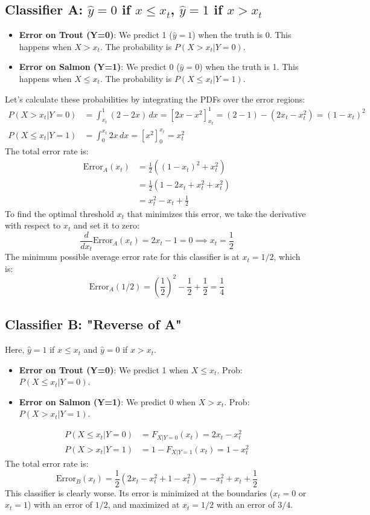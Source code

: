 \documentclass[11pt,a4paper]{article}
\begin{document}
\subsection{Classifier A: $\hat{y}=0$ if $x \le x_t$, $\hat{y}=1$ if $x > x_t$}
\begin{itemize}
    \item \textbf{Error on Trout (Y=0)}: We predict 1 ($\hat{y}=1$) when the truth is 0. This happens when $X > x_t$. The probability is $P(X > x_t | Y=0)$.
    \item \textbf{Error on Salmon (Y=1)}: We predict 0 ($\hat{y}=0$) when the truth is 1. This happens when $X \le x_t$. The probability is $P(X \le x_t | Y=1)$.
\end{itemize}
Let's calculate these probabilities by integrating the PDFs over the error regions:
\begin{align*}
    P(X > x_t | Y=0) &= \int_{x_t}^1 (2-2x) \,dx = [2x-x^2]_{x_t}^1 = (2-1) - (2x_t - x_t^2) = (1-x_t)^2 \\
    P(X \le x_t | Y=1) &= \int_0^{x_t} 2x \,dx = [x^2]_0^{x_t} = x_t^2
\end{align*}
The total error rate is:
\begin{align*}
    \text{Error}_A(x_t) &= \frac{1}{2} \left( (1-x_t)^2 + x_t^2 \right) \\
    &= \frac{1}{2} (1 - 2x_t + x_t^2 + x_t^2) \\
    &= x_t^2 - x_t + \frac{1}{2}
\end{align*}
To find the optimal threshold $x_t$ that minimizes this error, we take the derivative with respect to $x_t$ and set it to zero:
\[ \frac{d}{dx_t} \text{Error}_A(x_t) = 2x_t - 1 = 0 \implies x_t = \frac{1}{2} \]
The minimum possible average error rate for this classifier is at $x_t=1/2$, which is:
\[ \text{Error}_A(1/2) = \left(\frac{1}{2}\right)^2 - \frac{1}{2} + \frac{1}{2} = \frac{1}{4} \]

\subsection{Classifier B: "Reverse of A"}
Here, $\hat{y}=1$ if $x \le x_t$ and $\hat{y}=0$ if $x > x_t$.
\begin{itemize}
    \item \textbf{Error on Trout (Y=0)}: We predict 1 when $X \le x_t$. Prob: $P(X \le x_t | Y=0)$.
    \item \textbf{Error on Salmon (Y=1)}: We predict 0 when $X > x_t$. Prob: $P(X > x_t | Y=1)$.
\end{itemize}
\begin{align*}
    P(X \le x_t | Y=0) &= F_{X|Y=0}(x_t) = 2x_t - x_t^2 \\
    P(X > x_t | Y=1) &= 1 - F_{X|Y=1}(x_t) = 1 - x_t^2
\end{align*}
The total error rate is:
\[ \text{Error}_B(x_t) = \frac{1}{2} (2x_t - x_t^2 + 1 - x_t^2) = -x_t^2 + x_t + \frac{1}{2} \]
This classifier is clearly worse. Its error is minimized at the boundaries ($x_t=0$ or $x_t=1$) with an error of $1/2$, and maximized at $x_t=1/2$ with an error of $3/4$.
\end{document}
